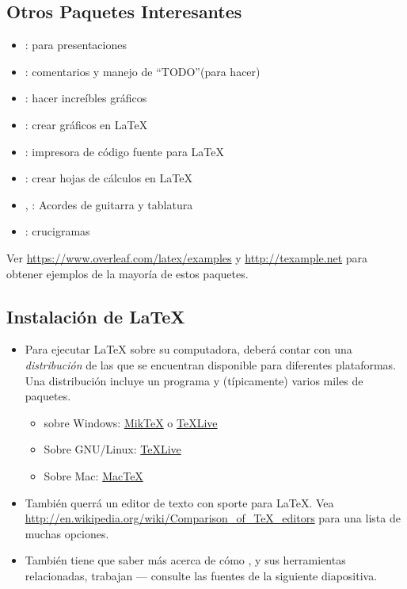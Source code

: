 \documentclass{beamer}
\begin{document}
\subsection{Otros Paquetes Interesantes}
\begin{frame}{\insertsubsection}
  \begin{itemize}
  \item {}: para presentaciones
  \item {}: comentarios y manejo de ``TODO''(para hacer)
  \item {}: hacer increíbles gráficos
  \item {}: crear gráficos en \LaTeX
  \item {}: impresora de código fuente para \LaTeX
  \item {}: crear hojas de cálculos en \LaTeX
  \item {}, : Acordes de guitarra y tablatura
  \item {}: crucigramas
  \end{itemize}
  Ver \url{https://www.overleaf.com/latex/examples} y \url{http://texample.net}
  para obtener ejemplos de la mayoría de estos paquetes.
\end{frame}

\subsection{Instalación de  \LaTeX{}}
\begin{frame}{\insertsubsection}
  \begin{itemize}
  \item Para ejecutar \LaTeX{} sobre su computadora, deberá contar con
    una \emph{distribución} de las que se encuentran disponible para
    diferentes plataformas. Una distribución incluye un programa
     y (típicamente) varios miles de paquetes.
    \begin{itemize}
    \item sobre Windows: \href{http://miktex.org/}{Mik\TeX} o \href{http://tug.org/texlive/}{\TeX Live}
    \item Sobre GNU/Linux: \href{http://tug.org/texlive/}{\TeX Live}
    \item Sobre Mac: \href{http://tug.org/mactex/}{Mac\TeX}
    \end{itemize}
  \item También querrá un editor de texto con sporte para
\LaTeX{}. Vea
\url{http://en.wikipedia.org/wiki/Comparison_of_TeX_editors} para una
lista de muchas opciones.
  \item También tiene que saber más acerca de cómo  , y sus
    herramientas relacionadas, trabajan --- consulte las fuentes de la
    siguiente diapositiva. 
  \end{itemize}
\end{frame}
\end{document}
